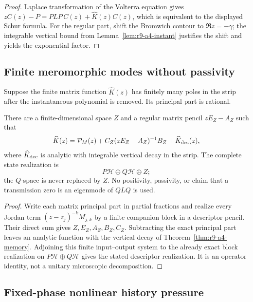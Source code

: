 \begin{proof}
Laplace transformation of the Volterra equation gives
$zC(z)-P=PLP\,C(z)+\widehat K(z)C(z)$, which is equivalent to the displayed
Schur formula.  For the regular part, shift the Bromwich contour to
$\Re z=-\gamma$; the integrable vertical bound from
Lemma~\ref{lem:r9-a4-instant} justifies the shift and yields the exponential
factor.
\end{proof}

\subsection{Finite meromorphic modes without passivity}

Suppose the finite matrix function $\widehat K(z)$ has finitely many poles in
the strip after the instantaneous polynomial is removed.  Its principal part
is rational.

\begin{theorem}
\label{thm:r9-a4-descriptor}
There are a finite-dimensional space $Z$ and a regular matrix pencil
$zE_Z-A_Z$ such that
\[
 \widehat K(z)=\mathcal P_M(z)
 +C_Z(zE_Z-A_Z)^{-1}B_Z
 +\widehat K_{\rm dec}(z),
\]
where $\widehat K_{\rm dec}$ is analytic with integrable vertical decay in the
strip.  The complete state realization is
\[
 P\mathcal H\oplus Q\mathcal H\oplus Z;
\]
the $Q$-space is never replaced by $Z$.  No positivity, passivity, or claim
that a transmission zero is an eigenmode of $QLQ$ is used.
\end{theorem}

\begin{proof}
Write each matrix principal part in partial fractions and realize every
Jordan term $(z-z_j)^{-k}M_{j,k}$ by a finite companion block in a descriptor
pencil.  Their direct sum gives $Z,E_Z,A_Z,B_Z,C_Z$.  Subtracting the exact
principal part leaves an analytic function with the vertical decay of
Theorem~\ref{thm:r9-a4-memory}.  Adjoining this finite input--output system to
the already exact block realization on $P\mathcal H\oplus Q\mathcal H$ gives
the stated descriptor realization.  It is an operator identity, not a unitary
microscopic decomposition.
\end{proof}

\subsection{Fixed-phase nonlinear history pressure}

